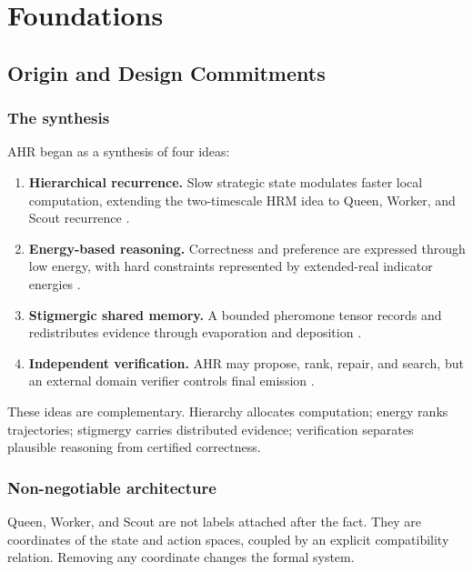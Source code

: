\documentclass[11pt,oneside]{book}
\theoremstyle{remark}
\begin{document}
\mainmatter

\part{Foundations}

\chapter{Origin and Design Commitments}

\section{The synthesis}

AHR began as a synthesis of four ideas:

\begin{enumerate}
  \item \textbf{Hierarchical recurrence.} Slow strategic state modulates faster local computation, extending the two-timescale HRM idea to Queen, Worker, and Scout recurrence \cite{WangHRM2025,FalkenburgAHRDesign2026}.
  \item \textbf{Energy-based reasoning.} Correctness and preference are expressed through low energy, with hard constraints represented by extended-real indicator energies \cite{LeCunEBM2006,BelangerSPEN2016}.
  \item \textbf{Stigmergic shared memory.} A bounded pheromone tensor records and redistributes evidence through evaporation and deposition \cite{DorigoACO1996,DorigoStutzle2004,TheraulazStigmergy1999}.
  \item \textbf{Independent verification.} AHR may propose, rank, repair, and search, but an external domain verifier controls final emission \cite{FalkenburgVerified2026}.
\end{enumerate}

These ideas are complementary. Hierarchy allocates computation; energy ranks trajectories; stigmergy carries distributed evidence; verification separates plausible reasoning from certified correctness.

\section{Non-negotiable architecture}

Queen, Worker, and Scout are not labels attached after the fact. They are coordinates of the state and action spaces, coupled by an explicit compatibility relation. Removing any coordinate changes the formal system.
\end{document}

